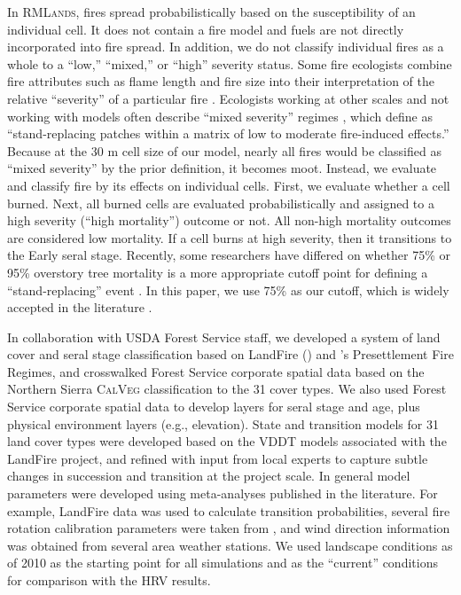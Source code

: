 In \textsc{RMLands}, fires spread probabilistically based on the susceptibility of an individual cell. It does not contain a fire model and fuels are not directly incorporated into fire spread. In addition, we do not classify individual fires as a whole to a ``low,'' ``mixed,'' or ``high'' severity status. Some fire ecologists combine fire attributes such as flame length and fire size into their interpretation of the relative ``severity'' of a particular fire \citep{Agee1993}.   Ecologists working at other scales and not working with models often describe ``mixed severity'' regimes \citep[e.g.,][]{Kane2013}, which \citet{Collins2010} define as ``stand-replacing patches within a matrix of low to moderate fire-induced effects.'' Because at the 30 m cell size of our model, nearly all fires would be classified as ``mixed severity'' by the prior definition, it becomes moot. Instead, we evaluate and classify fire by its effects on individual cells. First, we evaluate whether a cell burned. Next, all burned cells are evaluated probabilistically and assigned to a high severity (``high mortality'') outcome or not. All non-high mortality outcomes are considered low mortality. If a cell burns at high severity, then it transitions to the Early seral stage. Recently, some researchers have differed on whether 75\% or 95\% overstory tree mortality is a more appropriate cutoff point for defining a ``stand-replacing'' event \citep{Fule2014,Mallek2013}. In this paper, we use 75\% as our cutoff, which is widely accepted in the literature \citep{Miller2009,Baker2014,Agee1993,Agee2007}.


In collaboration with USDA Forest Service staff, we developed a system of land cover and seral stage classification based on LandFire () and \citet{VandeWater2011}'s Presettlement Fire Regimes, and crosswalked Forest Service corporate spatial data based on the Northern Sierra \textsc{CalVeg} classification to the 31 cover types. We also used Forest Service corporate spatial data to develop layers for seral stage and age, plus physical environment layers (e.g., elevation). State and transition models for 31 land cover types were developed based on the VDDT models associated with the LandFire project, and refined with input from local experts to capture subtle changes in succession and transition at the project scale. In general model parameters were developed using meta-analyses published in the literature. For example, LandFire data was used to calculate transition probabilities, several fire rotation calibration parameters were taken from \citet{Mallek2013}, and wind direction information was obtained from several area weather stations. We used landscape conditions as of 2010 as the starting point for all simulations and as the ``current'' conditions for comparison with the HRV results.

